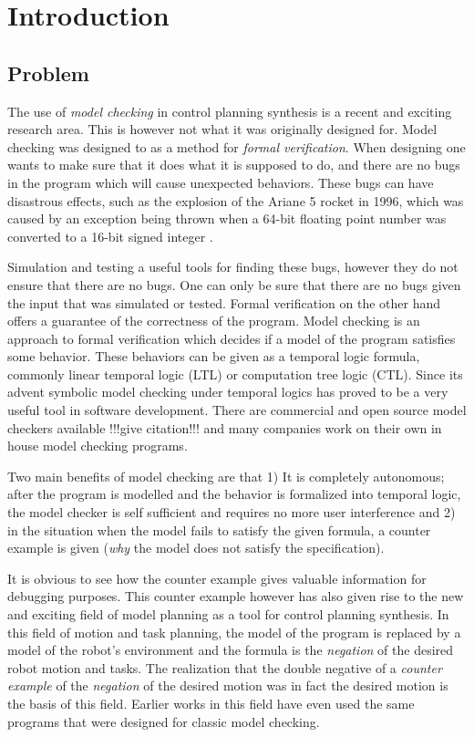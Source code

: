 \chapter{Introduction}
\section{Problem}
The use of \textit{model checking} in control planning synthesis is a recent and exciting research area. This is however not what it was originally designed for. Model checking was designed to as a method for \textit{formal verification}. When designing one wants to make sure that it does what it is supposed to do, and there are no bugs in the program which will cause unexpected behaviors. These bugs can have disastrous effects, such as the explosion of the Ariane 5 rocket in 1996, which was caused by an exception being thrown when a 64-bit floating point number was converted to a 16-bit signed integer \cite{clarke99}. 

Simulation and testing a useful tools for finding these bugs, however they do not ensure that there are no bugs. One can only be sure that there are no bugs given the input that was simulated or tested. Formal verification on the other hand offers a guarantee of the correctness of the program. Model checking is an approach to formal verification which decides if a model of the program satisfies some behavior. These behaviors can be given as a temporal logic formula, commonly linear temporal logic (LTL) or computation tree logic (CTL). Since its advent symbolic model checking under temporal logics has proved to be a very useful tool in software development. There are commercial and open source model checkers available !!!give citation!!! and many companies work on their own in house model checking programs. 

Two main benefits of model checking are that 1) It is completely autonomous; after the program is modelled and the behavior is formalized into temporal logic, the model checker is self sufficient and requires no more user interference and 2) in the situation when the model fails to satisfy the given formula, a counter example is given (\textit{why} the model does not satisfy the specification). 

It is obvious to see how the counter example gives valuable information for debugging purposes. This counter example however has also given rise to the new and exciting field of model planning as a tool for control planning synthesis. In this field of motion and task planning, the model of the program is replaced by a model of the robot's environment and the formula is the \textit{negation} of the desired robot motion and tasks. The realization that the double negative of a \textit{counter example} of the \textit{negation} of the desired motion was in fact the desired motion is the basis of this field. Earlier works in this field have even used the same programs that were designed for classic model checking. %

